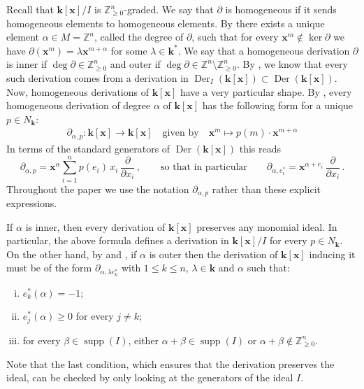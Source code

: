 \documentclass[11pt,letterpaper,reqno]{amsart}
\theoremstyle{remark}
\theoremstyle{definition}
\def\XX{\mathbf{x}}
\newcommand{\KK}[0]{\ensuremath{\mathbf{k}}}
\newcommand{\ZZ}[0]{\ensuremath{\mathbb{Z}}}
\newcommand{\supp}[0]{\ensuremath{\operatorname{supp}}}
\newcommand{\Der}[0]{\ensuremath{\operatorname{Der}}}
\begin{document}
Recall that $\KK[\XX]/I$ is $\ZZ^n_{\geq 0}$-graded. We say that $\partial$ is homogeneous if it sends homogeneous elements to homogeneous elements. By \cite[Lemma~1.1]{DL24} there exists a unique element $\alpha\in M=\ZZ^n$, called the degree of $\partial$, such that for every $\XX^m\notin\ker\partial$ we have $\partial(\XX^m)=\lambda\XX^{m+\alpha}$ for some $\lambda\in \KK^*$. We say that a homogeneous derivation $\partial$ is inner if $\deg\partial\in \ZZ^n_{\geq 0}$ and outer if $\deg\partial\in \ZZ^n\setminus \ZZ^n_{\geq 0}$. By \cite[Theorem~2.2]{DLMR24}, we know that every such derivation comes from a derivation in $\Der_I(\KK[\XX])\subset\Der(\KK[\XX])$. Now, homogeneous derivations of $\KK[\XX]$ have a very particular shape. By \cite[Proposition~3.1]{KLL15}, every homogeneous derivation of degree $\alpha$ of $\KK[\XX]$ has the following form for a unique $p\in N_\KK$:
\begin{align}\label{eq:homogeneous}
\partial_{\alpha,p}\colon \KK[\XX]\to \KK[\XX]\quad\mbox{given by}\quad \XX^m\mapsto p(m)\cdot\XX^{m+\alpha}
\end{align}
In terms of the standard generators of $\Der(\KK[\XX])$ this reads
$$\partial_{\alpha,p}=\XX^{\alpha}\sum_{i=1}^{n}p(e_i)\,x_i\,\frac{\partial}{\partial x_i}\,,
\qquad\mbox{so that in particular}\qquad
\partial_{\alpha,e_i^*}=\XX^{\alpha+e_i}\,\frac{\partial}{\partial x_i}\,.$$
Throughout the paper we use the notation $\partial_{\alpha,p}$ rather than these
explicit expressions.

If $\alpha$ is inner, then every derivation of $\KK[\XX]$ preserves any monomial ideal. In particular, the above formula defines a derivation in $\KK[\XX]/I$ for every $p\in N_\KK$. On the other hand, by \cite[Theorem~2.7]{liendo2010affine} and \cite[Theorem~2.2.1]{B95}, if $\alpha$ is outer then the derivation of $\KK[\XX]$ inducing it must be of the form $\partial_{\alpha,\lambda e^*_k}$ with $1\leq k\leq n$, $\lambda\in \KK$ and $\alpha$ such that:
\begin{enumerate}[(i)]
    \item $e_k^*(\alpha)=-1$;\label{eq:outer-i}
    \item $e_j^*(\alpha)\geq 0$ for every $j\neq k$;\label{eq:outer-ii}
    \item for every $\beta\in\supp(I)$, either $\alpha+\beta\in\supp(I)$ or $\alpha+\beta\not\in\ZZ_{\geq 0}^n$.\label{eq:outer-iii}
\end{enumerate}
Note that the last condition, which ensures that the derivation preserves the ideal, can be checked by only looking at the generators of the ideal $I$.
\end{document}
